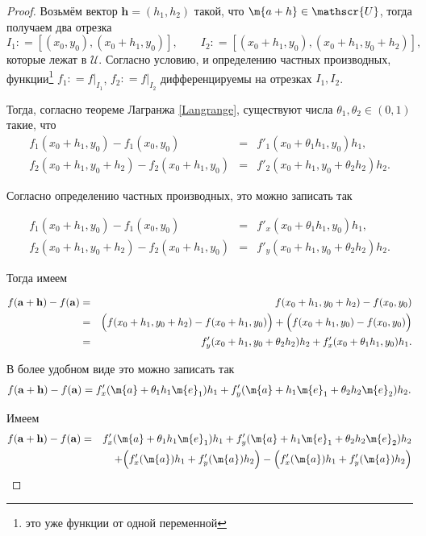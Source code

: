 \begin{proof}
Возьмём вектор \( \mathbf{h} = (h_1, h_2) \) такой, что $\m{a+h} \in \mathscr{U}$, тогда получаем два отрезка
\[
 I_1: = [ (x_0,y_0), (x_0 + h_1, y_0) ], \qquad I_2: = [ (x_0+h_1,y_0), (x_0+h_1, y_0+h_2) ],
\]
которые лежат в $\mathscr{U}$. Согласно условию, и определению частных производных, функции\footnote{это уже функции от одной переменной} $f_1: = f|_{I_1}$, $f_2: = f|_{I_2}$ дифференцируемы на отрезках $I_1, I_2$.

Тогда, согласно теореме Лагранжа \ref{Langrange}, существуют числа \( \theta_1, \theta_2 \in (0,1) \) такие, что
\begin{eqnarray*}
    f_1(x_0 + h_1, y_0) - f_1(x_0, y_0) &=& f'_1(x_0+\theta_1h_1, y_0)h_1,\\
    f_2(x_0 +h_1, y_0+h_2) - f_2(x_0+h_1, y_0) &=& f'_2(x_0 + h_1, y_0+\theta_2h_2)h_2.
\end{eqnarray*}

Согласно определению частных производных, это можно записать так

\begin{eqnarray*}
    f_1(x_0 + h_1, y_0) - f_1(x_0, y_0) &=& f'_x(x_0+\theta_1h_1, y_0)h_1,\\
    f_2(x_0 +h_1, y_0+h_2) - f_2(x_0+h_1, y_0) &=& f'_y(x_0 + h_1, y_0+\theta_2h_2)h_2.
\end{eqnarray*}

Тогда имеем

\begin{eqnarray*}
     f(\mathbf{a} + \mathbf{h}) - f(\mathbf{a}) &=& f(x_0 + h_1, y_0 + h_2) - f(x_0, y_0) \\
     &=& \Bigl( f(x_0 + h_1, y_0 + h_2) - f(x_0 + h_1, y_0) \Bigr)  + \Bigl(f(x_0 + h_1, y_0) - f(x_0, y_0)\Bigr)\\
     &=&f'_y(x_0 + h_1, y_0+\theta_2h_2)h_2 + f'_x(x_0+\theta_1h_1, y_0)h_1. 
\end{eqnarray*}

В более удобном виде это можно записать так
\[
 f(\mathbf{a} + \mathbf{h}) - f(\mathbf{a}) = f'_x(\m{a} + \theta_1 h_1 \m{e}_1)h_1 + f_y'(\m{a} + h_1\m{e}_1 + \theta_2 h_2 \m{e}_2)h_2.
\]

Имеем
\begin{eqnarray*}
    f(\mathbf{a} + \mathbf{h}) - f(\mathbf{a}) &=& f'_x(\m{a} + \theta_1 h_1 \m{e}_1)h_1 + f_y'(\m{a} + h_1\m{e}_1 + \theta_2 h_2 \m{e}_2)h_2 \\
    && + \Bigl( f'_x(\m{a})h_1 + f_y'(\m{a})h_2 \Bigr) - \Bigl(f'_x(\m{a})h_1 + f_y'(\m{a})h_2 \Bigr)
\end{eqnarray*}


\end{proof}
